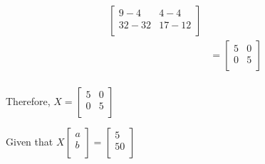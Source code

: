 \documentclass{article}
\begin{document}
\begin{align}
\begin{bmatrix}
    9 - 4 & 4 - 4\\
    32 - 32 & 17 - 12\\
    \end{bmatrix}\nonumber\\
    & = \begin{bmatrix}
    5 & 0\\
    0 & 5\\
    \end{bmatrix}\nonumber
    \end{align}\\ Therefore, $X = \begin{bmatrix}
    5 & 0\\
    0 & 5\\
    \end{bmatrix}$
    
 Given that $X\begin{bmatrix}
    a\\
    b\\
    \end{bmatrix}=\begin{bmatrix}
    5\\
    50\\
    \end{bmatrix}$
\end{document}
